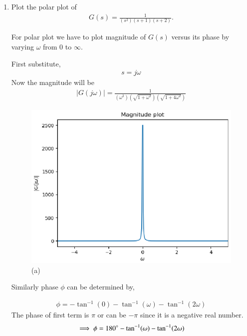 \begin{enumerate}[label=\thesection.\arabic*.,ref=\thesection.\theenumi]
\item Plot the polar plot of 
\begin{align}
    G(s) = \frac{1}{(s^2)(s+1)(s+2)}. 
    \label{eq:t1}
\end{align}

\solution
For polar plot we have to plot magnitude of $G(s)$ versus its phase
by varying $\omega$ from 0 to $\infty$.

First substitute, 
\begin{align}
    s = j\omega
\end{align}
Now the magnitude will be
\begin{align}
    |G(j\omega)| = \frac{1}{(\omega^2)(\sqrt{1 + \omega^2})(\sqrt{1+4\omega^2})}
    \label{eq:two}
\end{align}

\begin{figure}[!h]
  \includegraphics[width=\columnwidth]{./figs/ee18btech11028/magnitude.eps}
  \caption{(a)}
  \label{fig:magnitude}
\end{figure}

Similarly phase $\phi$ can be determined by,

\begin{align}
  \phi = - \tan^{-1}(0) - \tan^{-1}(\omega) - \tan^{-1}(2\omega)
\end{align}
The phase of first term is $\pi$ or can be $-\pi$ since it is a negative real number.
\begin{align}
    \implies \phi = 180\degree - \tan^{-1}(\omega) - \tan^{-1}(2\omega)
    \label{eq:one}
\end{align}


\end{enumerate}
